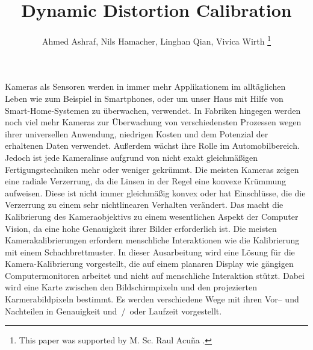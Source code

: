 \documentclass[journal,final,a4paper,twoside]{PS}
\begin{document}
\newcommand{\euertitel}{Dynamic Distortion Calibration}   %
\newcommand{\betreuer}{M. Sc. Raul Acu\~na }  %


\headsep 40pt
\title{\euertitel}
\author{Ahmed Ashraf,
        Nils Hamacher,
        Linghan Qian,
	Vivica Wirth
\thanks{This paper was supported by \betreuer.}}

\maketitle


\begin{Zusammenfassung}
Kameras als Sensoren werden in immer mehr Applikationem im allt\"aglichen Leben wie zum Beispiel in Smartphones, oder um unser Haus mit Hilfe von Smart-Home-Systemen zu \"uberwachen, verwendet. In Fabriken hingegen werden noch viel mehr Kameras zur \"Uberwachung von verschiedensten Prozessen wegen ihrer universellen Anwendung, niedrigen Kosten und dem Potenzial der erhaltenen Daten verwendet. Au\ss{}erdem w\"achst ihre Rolle im Automobilbereich. Jedoch ist jede Kameralinse aufgrund von nicht exakt gleichm\"a\ss{}igen Fertigungstechniken mehr oder weniger gekr\"ummt. Die meisten Kameras zeigen eine radiale Verzerrung, da die Linsen in der Regel eine konvexe Kr\"ummung aufweisen. Diese ist nicht immer gleichm\"a\ss{}ig konvex oder hat Einschl\"usse, die die Verzerrung zu einem sehr nichtlinearen Verhalten ver\"andert. Das macht die Kalibrierung des Kameraobjektivs zu einem wesentlichen Aspekt der Computer Vision, da eine hohe Genauigkeit ihrer Bilder erforderlich ist. Die meisten Kamerakalibrierungen erfordern menschliche Interaktionen wie die Kalibrierung mit einem Schachbrettmuster. In dieser Ausarbeitung wird eine L\"osung f\"ur die Kamera-Kalibrierung vorgestellt, die auf einem planaren Display wie g\"angigen Computermonitoren arbeitet und nicht auf menschliche Interaktion st\"utzt. Dabei wird eine Karte zwischen den Bildschirmpixeln und den projezierten Karmerabildpixeln bestimmt. Es werden verschiedene Wege mit ihren Vor-- und Nachteilen in Genauigkeit und~/~oder Laufzeit vorgestellt.
\end{Zusammenfassung}
\vspace{6pt}
\end{document}
